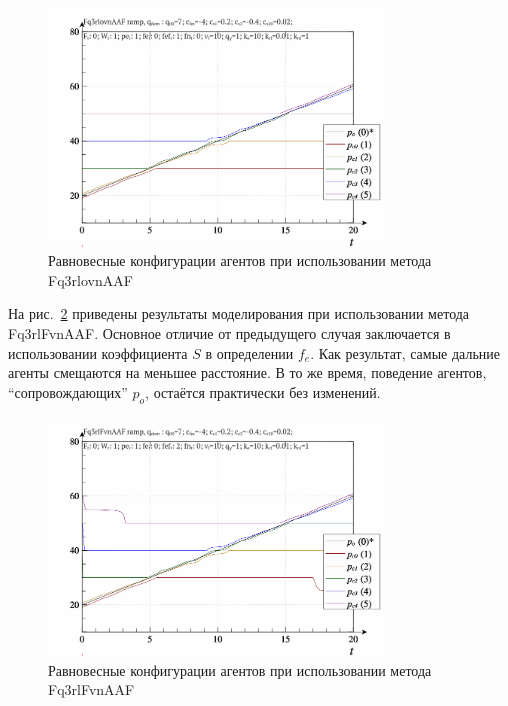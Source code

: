 \begin{figure}[htb!]
  \centerline{
    \includegraphics[width=0.8\textwidth]{p/ramp/qls-p_t_pi_Fq3rlovnAAF_ramp.png}
  }
  \caption{Равновесные конфигурации агентов при использовании метода Fq3rlovnAAF}
  \label{atu:f:qls_ramp_Fq3rlovnAAF}
\end{figure}

На рис.~\ref{atu:f:qls_ramp_Fq3rlFvnAAF} приведены результаты моделирования
при использовании метода Fq3rlFvnAAF.
Основное отличие от предыдущего
случая заключается в использовании коэффициента $S$ в определении $f_e$.
Как результат, самые дальние агенты смещаются на меньшее расстояние.
В то же время, поведение агентов, ``сопровождающих'' $p_o$,
остаётся практически без изменений.


\begin{figure}[htb!]
  \centerline{
    \includegraphics[width=0.8\textwidth]{p/ramp/qls-p_t_pi_Fq3rlFvnAAF_ramp.png}
  }
  \caption{Равновесные конфигурации агентов при использовании метода Fq3rlFvnAAF}
  \label{atu:f:qls_ramp_Fq3rlFvnAAF}
\end{figure}


